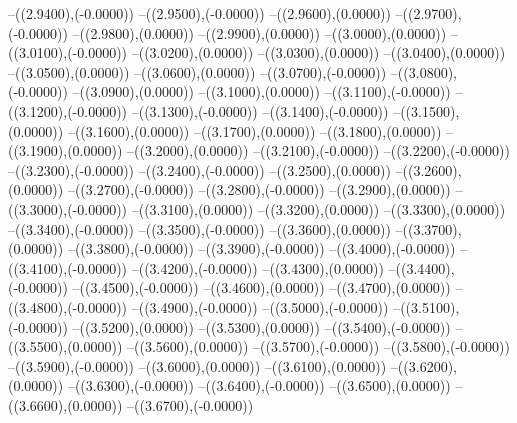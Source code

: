 {	--({\sx*(2.9400)},{\sy*(-0.0000)})
	--({\sx*(2.9500)},{\sy*(-0.0000)})
	--({\sx*(2.9600)},{\sy*(0.0000)})
	--({\sx*(2.9700)},{\sy*(-0.0000)})
	--({\sx*(2.9800)},{\sy*(0.0000)})
	--({\sx*(2.9900)},{\sy*(0.0000)})
	--({\sx*(3.0000)},{\sy*(0.0000)})
	--({\sx*(3.0100)},{\sy*(-0.0000)})
	--({\sx*(3.0200)},{\sy*(0.0000)})
	--({\sx*(3.0300)},{\sy*(0.0000)})
	--({\sx*(3.0400)},{\sy*(0.0000)})
	--({\sx*(3.0500)},{\sy*(0.0000)})
	--({\sx*(3.0600)},{\sy*(0.0000)})
	--({\sx*(3.0700)},{\sy*(-0.0000)})
	--({\sx*(3.0800)},{\sy*(-0.0000)})
	--({\sx*(3.0900)},{\sy*(0.0000)})
	--({\sx*(3.1000)},{\sy*(0.0000)})
	--({\sx*(3.1100)},{\sy*(-0.0000)})
	--({\sx*(3.1200)},{\sy*(-0.0000)})
	--({\sx*(3.1300)},{\sy*(-0.0000)})
	--({\sx*(3.1400)},{\sy*(-0.0000)})
	--({\sx*(3.1500)},{\sy*(0.0000)})
	--({\sx*(3.1600)},{\sy*(0.0000)})
	--({\sx*(3.1700)},{\sy*(0.0000)})
	--({\sx*(3.1800)},{\sy*(0.0000)})
	--({\sx*(3.1900)},{\sy*(0.0000)})
	--({\sx*(3.2000)},{\sy*(0.0000)})
	--({\sx*(3.2100)},{\sy*(-0.0000)})
	--({\sx*(3.2200)},{\sy*(-0.0000)})
	--({\sx*(3.2300)},{\sy*(-0.0000)})
	--({\sx*(3.2400)},{\sy*(-0.0000)})
	--({\sx*(3.2500)},{\sy*(0.0000)})
	--({\sx*(3.2600)},{\sy*(0.0000)})
	--({\sx*(3.2700)},{\sy*(-0.0000)})
	--({\sx*(3.2800)},{\sy*(-0.0000)})
	--({\sx*(3.2900)},{\sy*(0.0000)})
	--({\sx*(3.3000)},{\sy*(-0.0000)})
	--({\sx*(3.3100)},{\sy*(0.0000)})
	--({\sx*(3.3200)},{\sy*(0.0000)})
	--({\sx*(3.3300)},{\sy*(0.0000)})
	--({\sx*(3.3400)},{\sy*(-0.0000)})
	--({\sx*(3.3500)},{\sy*(-0.0000)})
	--({\sx*(3.3600)},{\sy*(0.0000)})
	--({\sx*(3.3700)},{\sy*(0.0000)})
	--({\sx*(3.3800)},{\sy*(-0.0000)})
	--({\sx*(3.3900)},{\sy*(-0.0000)})
	--({\sx*(3.4000)},{\sy*(-0.0000)})
	--({\sx*(3.4100)},{\sy*(-0.0000)})
	--({\sx*(3.4200)},{\sy*(-0.0000)})
	--({\sx*(3.4300)},{\sy*(0.0000)})
	--({\sx*(3.4400)},{\sy*(-0.0000)})
	--({\sx*(3.4500)},{\sy*(-0.0000)})
	--({\sx*(3.4600)},{\sy*(0.0000)})
	--({\sx*(3.4700)},{\sy*(0.0000)})
	--({\sx*(3.4800)},{\sy*(-0.0000)})
	--({\sx*(3.4900)},{\sy*(-0.0000)})
	--({\sx*(3.5000)},{\sy*(-0.0000)})
	--({\sx*(3.5100)},{\sy*(-0.0000)})
	--({\sx*(3.5200)},{\sy*(0.0000)})
	--({\sx*(3.5300)},{\sy*(0.0000)})
	--({\sx*(3.5400)},{\sy*(-0.0000)})
	--({\sx*(3.5500)},{\sy*(0.0000)})
	--({\sx*(3.5600)},{\sy*(0.0000)})
	--({\sx*(3.5700)},{\sy*(-0.0000)})
	--({\sx*(3.5800)},{\sy*(-0.0000)})
	--({\sx*(3.5900)},{\sy*(-0.0000)})
	--({\sx*(3.6000)},{\sy*(0.0000)})
	--({\sx*(3.6100)},{\sy*(0.0000)})
	--({\sx*(3.6200)},{\sy*(0.0000)})
	--({\sx*(3.6300)},{\sy*(-0.0000)})
	--({\sx*(3.6400)},{\sy*(-0.0000)})
	--({\sx*(3.6500)},{\sy*(0.0000)})
	--({\sx*(3.6600)},{\sy*(0.0000)})
	--({\sx*(3.6700)},{\sy*(-0.0000)})
}
